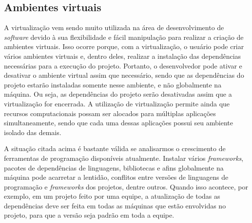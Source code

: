 \subsection{{Ambientes virtuais}}

A virtualização vem sendo muito utilizada na área de desenvolvimento de \textit{software} devido à sua flexibilidade e fácil manipulação para realizar a criação de ambientes virtuais. Isso ocorre porque, com a virtualização, o usuário pode criar vários ambientes virtuais e, dentro deles, realizar a instalação das dependências necessárias para a execução do projeto. Portanto, o desenvolvedor pode ativar e desativar o ambiente virtual assim que necessário, sendo que as dependências do projeto estarão instaladas somente nesse ambiente, e não globalmente na máquina. Ou seja, as dependências do projeto serão desativadas assim que a virtualização for encerrada. A utilização de virtualização permite ainda que recursos computacionais possam ser alocados para múltiplas aplicações simultaneamente, sendo que cada uma dessas aplicações possui seu ambiente isolado das demais.

A situação citada acima é bastante válida se analisarmos o crescimento de ferramentas de programação disponíveis atualmente. Instalar vários \textit{frameworks}, pacotes de dependências de linguagens, bibliotecas e afins globalmente na máquina pode acarretar a lentidão, conflitos entre versões de linguagens de programação e \textit{frameworks} dos projetos, dentre outros. Quando isso acontece, por exemplo, em um projeto feito por uma equipe, a atualização de todas as dependências deve ser feita em todas as máquinas que estão envolvidas no projeto, para que a versão seja padrão em toda a equipe.